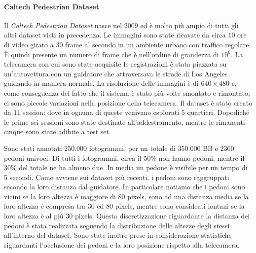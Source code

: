 \paragraph{Caltech Pedestrian Dataset} Il \textit{Caltech Pedestrian Dataset} \cite{dollar2009pedestrian} nasce nel $2009$ ed è molto più ampio di tutti gli altri dataset visti in precedenza. Le immagini sono state ricavate da circa $10$ ore di video girato a $30$ frame al secondo in un ambiente urbano con traffico regolare. È quindi presente un numero di frame che è nell'ordine di grandezza di $10^6$. La telecamera con cui sono state acquisite le registrazioni è stata piazzata su un'autovettura con un guidatore che attraversava le strade di Los Angeles guidando in maniera normale. La risoluzione delle immagini è di $640 \times 480$ e, come conseguenza del fatto che il sistema è stato più volte smontato e rimontato, ci sono piccole variazioni nella posizione della telecamera. Il dataset è stato creato da $11$ sessioni dove in ognuna di queste venivano esplorati $5$ quartieri. Dopodiché le prime sei sessioni sono state destinate all'addestramento, mentre le rimanenti cinque sono state adibite a test set.

Sono stati annotati $250.000$ fotogrammi, per un totale di $350.000$ \ac{BB} e $2300$ pedoni univoci. Di tutti i fotogrammi, circa il $50\%$ non hanno pedoni, mentre il $30\%$ del totale ne ha almeno due. In media un pedone è visibile per un tempo di 5 secondi. Come avviene sui dataset più recenti, i pedoni sono raggruppati secondo la loro distanza dal guidatore. In particolare notiamo che i pedoni sono vicini se la loro altezza è maggiore di $80$ pixels, sono ad una distanza media se la loro altezza è compresa tra $30$ ed $80$ pixels, mentre sono consideati lontani se la loro altezza è al più $30$ pixels. Questa discretizzazione riguardante la distanza dei pedoni è stata realizzata seguendo la distribuzione delle altezze degli stessi all'interno del dataset. Sono state inoltre prese in considerazione statistiche riguardanti l'occlusione dei pedoni e la loro posizione rispetto alla telecamera.



